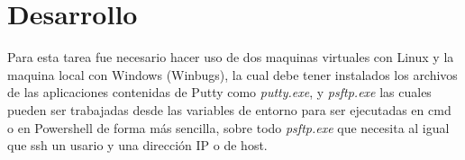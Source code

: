 \documentclass[10pt,executivepaper]{article}
\begin{document}
\begin{center}
	\par{}
\par{}
\par{}
\par\vspace{2cm}{
	Ultima fecha modificado: \today
}
\end{center}

\clearpage
\section{Desarrollo}
Para esta tarea fue necesario hacer uso de dos maquinas virtuales con Linux y la maquina local con Windows (Winbugs), la cual debe tener instalados los archivos de las aplicaciones contenidas de Putty como \textit{putty.exe}, y \textit{psftp.exe} las cuales pueden ser trabajadas desde las variables de entorno para ser ejecutadas en cmd o en Powershell de forma más sencilla, sobre todo \textit{psftp.exe} que necesita al igual que ssh un usario y una dirección IP o de host.
\end{document}
